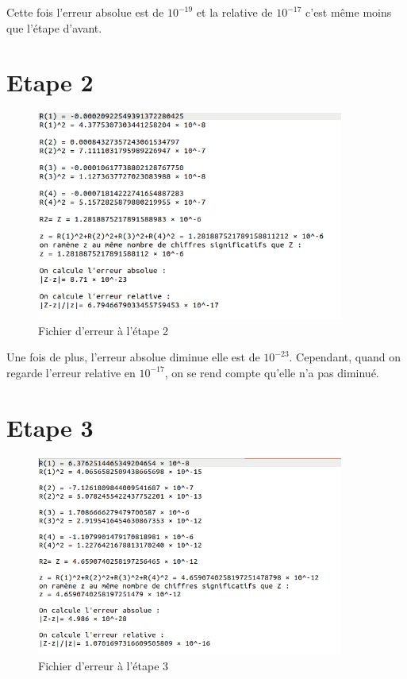 \documentclass[12,french]{report}
\begin{document}
Cette fois l'erreur absolue est de $10^{-19}$ et la relative de $10^{-17}$ c'est même moins que l'étape d'avant.

\section{Etape 2}

\begin{figure}[H]
	\center
	\includegraphics[width=0.9\textwidth]{./Images/r_2_err}
	\caption{Fichier d'erreur à l'étape 2}
\end{figure}

Une fois de plus, l'erreur absolue diminue elle est de $10^{-23}$. Cependant, quand on regarde l'erreur relative en $10^{-17}$, on se rend compte qu'elle n'a pas diminué.

\section{Etape 3}

\begin{figure}[H]
	\center
	\includegraphics[width=0.9\textwidth]{./Images/r_3_err}
	\caption{Fichier d'erreur à l'étape 3}
\end{figure}
\end{document}

